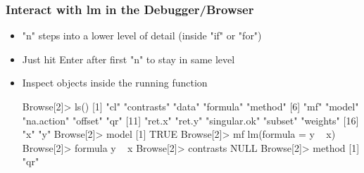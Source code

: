 \documentclass[10pt,english]{beamer}
\begin{document}
\begin{frame}
  \frametitle{Interact with lm in the Debugger/Browser}
\begin{itemize}
   
  \item "n" steps into a lower level of detail (inside "if" or "for")  
  \item Just hit Enter after first "n" to stay in same level
  \begin{Schunk}
\end{Schunk}     

\item Inspect objects inside the running function
  \begin{Schunk}
    \begin{Soutput}
Browse[2]> ls()
 [1] "cl"          "contrasts"   "data"        "formula"     "method"
 [6] "mf"          "model"       "na.action"   "offset"      "qr"
[11] "ret.x"       "ret.y"       "singular.ok" "subset"      "weights"
[16] "x"           "y"
Browse[2]> model
[1] TRUE
Browse[2]> mf
lm(formula = y ~ x)
Browse[2]> formula
y ~ x
Browse[2]> contrasts
NULL
Browse[2]> method
[1] "qr"
\end{Soutput}
\end{Schunk}
\end{itemize}
\end{frame}
\end{document}

